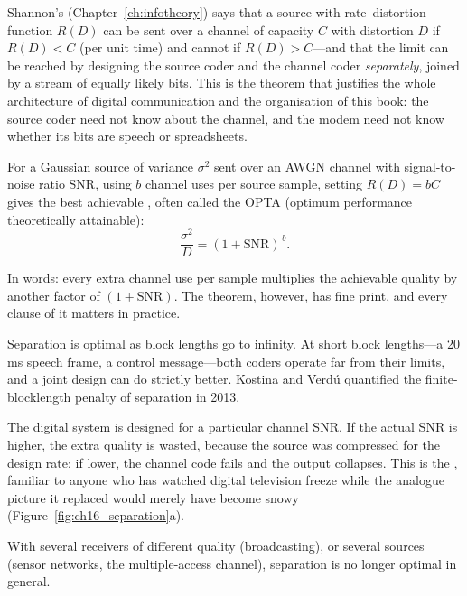 Shannon's  (Chapter~\ref{ch:infotheory}) says that a source
with rate--distortion function $R(D)$ can be sent over a channel of capacity $C$ with distortion $D$ if
$R(D)<C$ (per unit time) and cannot if $R(D)>C$---and that the limit can be reached by designing the
source coder and the channel coder \emph{separately}, joined by a stream of equally likely bits. This is
the theorem that justifies the whole architecture of digital communication and the organisation of this
book: the source coder need not know about the channel, and the modem need not know whether its bits are
speech or spreadsheets.

For a Gaussian source of variance $\sigma^2$ sent over an AWGN channel with signal-to-noise ratio SNR,
using $b$ channel uses per source sample, setting $R(D)=bC$ gives the best achievable
, often called the OPTA (optimum performance theoretically attainable):
\begin{equation}
\frac{\sigma^2}{D}=(1+\mathrm{SNR})^{\,b}.
\label{eq:ch16:opta}
\end{equation}

In words: every extra channel use per sample multiplies the achievable quality by another factor of
$(1+\mathrm{SNR})$. The theorem, however, has fine print, and every clause of it matters in practice.
\begin{description}[style=nextline,leftmargin=1.2em,font=\sffamily\bfseries\small\color{navy}]
\item[Unlimited delay and complexity.] Separation is optimal as block lengths go to infinity. At short
block lengths---a 20\,ms speech frame, a control message---both coders operate far from their limits, and
a joint design can do strictly better. Kostina and Verd\'u quantified the finite-blocklength penalty of
separation in 2013.
\item[A single, known channel.] The digital system is designed for a particular channel SNR. If the
actual SNR is higher, the extra quality is wasted, because the source was compressed for the design
rate; if lower, the channel code fails and the output collapses. This is the ,
familiar to anyone who has watched digital television freeze while the analogue picture it replaced
would merely have become snowy (Figure~\ref{fig:ch16_separation}a).
\item[Point-to-point.] With several receivers of different quality (broadcasting), or several sources
(sensor networks, the multiple-access channel), separation is no longer optimal in general.
\end{description}


